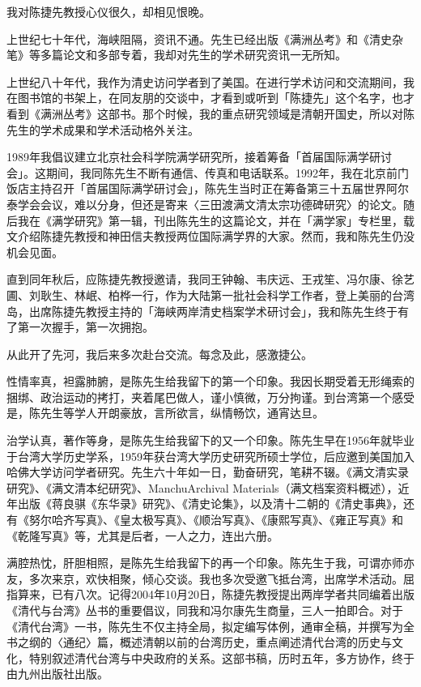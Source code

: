 我对陈捷先教授心仪很久，却相见恨晚。

上世纪七十年代，海峡阻隔，资讯不通。先生已经出版《满洲丛考》和《清史杂笔》等多篇论文和多部专着，我却对先生的学术研究资讯一无所知。

上世纪八十年代，我作为清史访问学者到了美国。在进行学术访问和交流期间，我在图书馆的书架上，在同友朋的交谈中，才看到或听到「陈捷先」这个名字，也才看到《满洲丛考》这部书。那个时候，我的重点研究领域是清朝开国史，所以对陈先生的学术成果和学术活动格外关注。

1989年我倡议建立北京社会科学院满学研究所，接着筹备「首届国际满学研讨会」。这期间，我同陈先生不断有通信、传真和电话联系。1992年，我在北京前门饭店主持召开「首届国际满学研讨会」，陈先生当时正在筹备第三十五届世界阿尔泰学会会议，难以分身，但还是寄来〈三田渡满文清太宗功德碑研究〉的论文。随后我在《满学研究》第一辑，刊出陈先生的这篇论文，并在「满学家」专栏里，载文介绍陈捷先教授和神田信夫教授两位国际满学界的大家。然而，我和陈先生仍没机会见面。

直到同年秋后，应陈捷先教授邀请，我同王钟翰、韦庆远、王戎笙、冯尔康、徐艺圃、刘耿生、林岷、柏桦一行，作为大陆第一批社会科学工作者，登上美丽的台湾岛，出席陈捷先教授主持的「海峡两岸清史档案学术研讨会」，我和陈先生终于有了第一次握手，第一次拥抱。

从此开了先河，我后来多次赴台交流。每念及此，感激捷公。

性情率真，袒露肺腑，是陈先生给我留下的第一个印象。我因长期受着无形绳索的捆绑、政治运动的拷打，夹着尾巴做人，谨小慎微，万分拘谨。到台湾第一个感受是，陈先生等学人开朗豪放，言所欲言，纵情畅饮，通宵达旦。


治学认真，著作等身，是陈先生给我留下的又一个印象。陈先生早在1956年就毕业于台湾大学历史学系，1959年获台湾大学历史研究所硕士学位，后应邀到美国加入哈佛大学访问学者研究。先生六十年如一日，勤奋研究，笔耕不辍。《满文清实录研究》、《满文清本纪研究》、ManchuArchival Materials（满文档案资料概述），近年出版《蒋良骐《东华录》研究》、《清史论集》，以及清十二朝的《清史事典》，还有《努尔哈齐写真》、《皇太极写真》、《顺治写真》、《康熙写真》、《雍正写真》和《乾隆写真》等，尤其是后者，一人之力，连出六册。

满腔热忱，肝胆相照，是陈先生给我留下的再一个印象。陈先生于我，可谓亦师亦友，多次来京，欢快相聚，倾心交谈。我也多次受邀飞抵台湾，出席学术活动。屈指算来，已有八次。记得2004年10月20日，陈捷先教授提出两岸学者共同编着出版《清代与台湾》丛书的重要倡议，同我和冯尔康先生商量，三人一拍即合。对于《清代台湾》一书，陈先生不仅主持全局，拟定编写体例，通审全稿，并撰写为全书之纲的〈通纪〉篇，概述清朝以前的台湾历史，重点阐述清代台湾的历史与文化，特别叙述清代台湾与中央政府的关系。这部书稿，历时五年，多方协作，终于由九州出版社出版。

